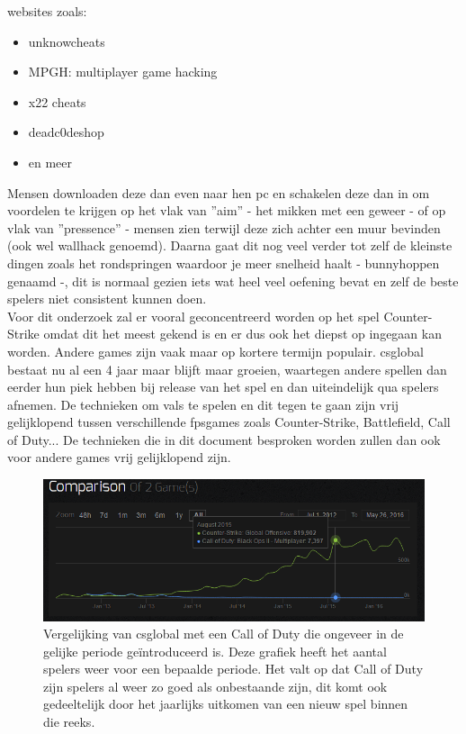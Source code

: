 \documentclass[pdftex,a4paper,12pt,twoside]{report}
\begin{document}
websites zoals: 
\begin{itemize}
\item unknowcheats
\item MPGH: multiplayer game hacking
\item x22 cheats 
\item deadc0deshop
\item en meer
\\
\end{itemize}


 Mensen downloaden deze dan even naar hen pc en schakelen deze dan in om voordelen te krijgen op het vlak van ''\gls{aim}'' - het mikken met een geweer - of op vlak van ''pressence'' - mensen zien terwijl deze zich achter een muur bevinden (ook wel wallhack genoemd). Daarna gaat dit nog veel verder tot zelf de kleinste dingen zoals het rondspringen waardoor je meer snelheid haalt - bunnyhoppen genaamd -, dit is normaal gezien iets wat heel veel oefening bevat en zelf de beste spelers niet consistent kunnen doen. 
\\

Voor dit onderzoek zal er vooral geconcentreerd worden op het spel Counter-Strike omdat dit het meest gekend is en er dus ook het diepst op ingegaan kan worden. Andere games zijn vaak maar op kortere termijn populair. \gls{csglobal} bestaat nu al een 4 jaar maar blijft maar groeien, waartegen andere spellen dan eerder hun piek hebben bij release van het spel en dan uiteindelijk qua spelers afnemen. De technieken om vals te spelen en dit tegen te gaan zijn vrij gelijklopend tussen verschillende \gls{fpsgames} zoals Counter-Strike, Battlefield, Call of Duty... De technieken die in dit document besproken worden zullen dan ook voor andere games vrij gelijklopend zijn.
\\

\newpage

\begin{figure}[H]
\centering
\includegraphics[width=15cm]{img/csgovsbo3}
\caption{Vergelijking van \gls{csglobal} met een Call of Duty die ongeveer in de gelijke periode geïntroduceerd is. Deze grafiek heeft het aantal spelers weer voor een bepaalde periode. Het valt op dat Call of Duty zijn spelers al weer zo goed als onbestaande zijn, dit komt ook gedeeltelijk door het jaarlijks uitkomen van een nieuw spel binnen die reeks. \citep{steamcharts}}
\end{figure} 
\end{document}
